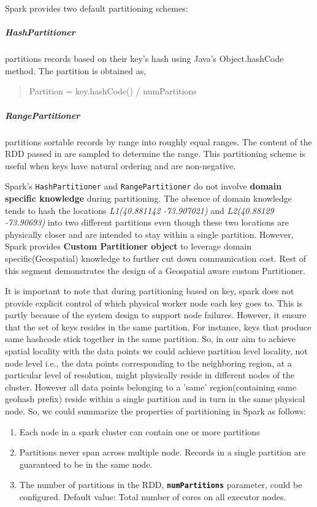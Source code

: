 \documentclass[article,type=msc,colorback,10pt,accentcolor=tud1d]{tudthesis}
\begin{document}
			\clearpage
			\par Spark provides two default partitioning schemes:
			\subparagraph{HashPartitioner} partitions records based on their key's hash using Java's Object.hashCode method. The partition is obtained as,
			
			\begin{quote}
				\centering Partition = key.hashCode() / numPartitions
			\end{quote}
			
			\subparagraph{RangePartitioner} partitions sortable records by range into roughly equal ranges. The content of the RDD passed in are sampled to determine the range\cite{sparkapiPartitioner}. This partitioning scheme is useful when keys have natural ordering and are non-negative.
			
			Spark's \texttt{HashPartitioner} and \texttt{RangePartitioner} do not involve \textbf{domain specific knowledge} during partitioning. The absence of domain knowledge tends to hash the locations \textit{L1(40.881142 -73.907021)} and \textit{L2(40.88129 -73.90693)} into two different partitions even though these two locations are physically closer and are intended to stay within a single partition. However, Spark provides \textbf{Custom Partitioner object} to leverage domain specific(Geospatial) knowledge to further cut down communication cost. Rest of this segment demonstrates the design of a Geospatial aware custom Partitioner.
			
			\par It is important to note that during partitioning based on key, spark does not provide explicit control of which physical worker node each key goes to. This is partly because of the system design to support node failures.\cite{sparkbook} However, it ensure that the set of keys resides in the same partition. For instance, keys that produce same hashcode stick together  in the same partition. So, in our aim to achieve spatial locality with the data points we could achieve partition level locality, not node level i.e., the data points corresponding to the neighboring region, at a particular level of resolution, might physically reside in different nodes of the cluster. However all data points belonging to a 'same' region(containing same geohash prefix) reside within a single partition and in turn in the same physical node. So, we could summarize the properties of partitioning in Spark as follows: \cite{partitioningHeather} 
			 
			 \begin{enumerate}
			 	\item Each node in a spark cluster can contain one or more partitions
			 \item Partitions never span across multiple node. Records in a single partition are guaranteed to be in the same node.
			\item  The number of partitions in the RDD, \texttt{\textbf{numPartitions}} parameter, could be configured. Default value: Total number of cores on all executor nodes.
			 \end{enumerate}
			
\end{document}
